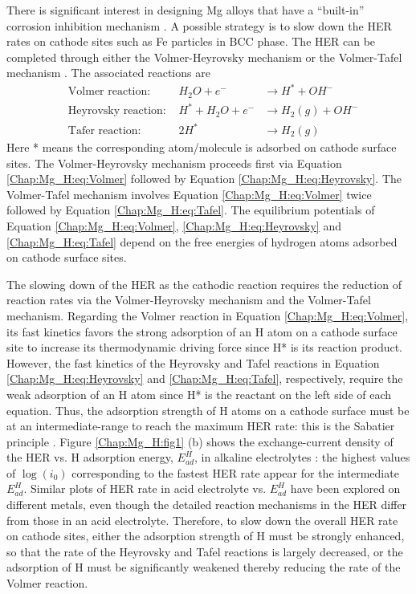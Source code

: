 There is significant interest in designing Mg alloys that have a ``built-in'' corrosion inhibition mechanism \cite{eaves2012inhibition}. A possible strategy is to slow down the HER rates on cathode sites such as Fe particles in \ac{BCC} phase. The HER can be completed through either the Volmer-Heyrovsky mechanism or the Volmer-Tafel mechanism \cite{ghali2010corrosion,walling1968electrochemical}. The associated reactions are
\begin{subequations}
\begin{align}
&\text{Volmer reaction:    } & H_2O + e^- & \rightarrow H^* + OH^-
 \label{Chap:Mg_H:eq:Volmer}\\
&\text{Heyrovsky reaction:    } & H^* + H_2O + e^- & \rightarrow H_2(g) + OH^-
 \label{Chap:Mg_H:eq:Heyrovsky}\\
&\text{Tafer reaction:    }
& 2H^* & \rightarrow H_2(g)
 \label{Chap:Mg_H:eq:Tafel}
\end{align}
\end{subequations}
Here * means the corresponding atom/molecule is adsorbed on cathode surface sites. The Volmer-Heyrovsky mechanism proceeds first via Equation \ref{Chap:Mg_H:eq:Volmer} followed by Equation \ref{Chap:Mg_H:eq:Heyrovsky}. The Volmer-Tafel mechanism involves Equation \ref{Chap:Mg_H:eq:Volmer} twice followed by Equation \ref{Chap:Mg_H:eq:Tafel}. The equilibrium potentials of Equation \ref{Chap:Mg_H:eq:Volmer}, \ref{Chap:Mg_H:eq:Heyrovsky} and \ref{Chap:Mg_H:eq:Tafel} depend on the free energies of hydrogen atoms adsorbed on cathode surface sites.


The slowing down of the HER as the cathodic reaction requires the reduction of reaction rates via the Volmer-Heyrovsky mechanism and the Volmer-Tafel mechanism. Regarding the Volmer reaction in Equation \ref{Chap:Mg_H:eq:Volmer}, its fast kinetics favors the strong adsorption of an H atom on a cathode surface site to increase its thermodynamic driving force since H* is its reaction product. However, the fast kinetics of the Heyrovsky and Tafel reactions in Equation \ref{Chap:Mg_H:eq:Heyrovsky} and \ref{Chap:Mg_H:eq:Tafel}, respectively, require the weak adsorption of an H atom since H* is the reactant on the left side of each equation. Thus, the adsorption strength of H atoms on a cathode surface must be at an intermediate-range to reach the maximum \ac{HER} rate: this is the Sabatier principle \cite{medford2015sabatier}. Figure \ref{Chap:Mg_H:fig1} (b) shows the exchange-current density of the \ac{HER} vs. H adsorption energy, $E_{ad}^H$, in alkaline electrolytes \cite{sheng2013correlating}: the highest values of $\log(i_0)$ corresponding to the fastest \ac{HER} rate appear for the intermediate $E_{ad}^H$. Similar plots of \ac{HER} rate in acid electrolyte vs. $E_{ad}^H$ have been explored on different metals, even though the detailed reaction mechanisms in the \ac{HER} differ from those in an acid electrolyte. Therefore, to slow down the overall \ac{HER} rate on cathode sites, either the adsorption strength of H must be strongly enhanced, so that the rate of the Heyrovsky and Tafel reactions is largely decreased, or the adsorption of H must be significantly weakened thereby reducing the rate of the Volmer reaction.

